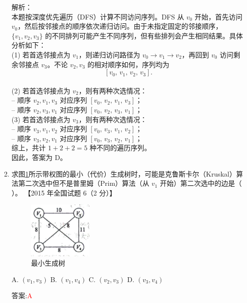 \documentclass[lang=cn,newtx,10pt,scheme=chinese]{../../../elegantbook}
\begin{document}
\begin{enumerate}
    解析：\\
    本题按深度优先遍历（DFS）计算不同访问序列。DFS 从 $v_0$ 开始，首先访问 $v_0$，然后按邻接点的顺序依次递归访问。由于未指定固定的邻接顺序，$\{v_1,v_2,v_3\}$ 的不同排列可能产生不同序列，但有些排列会产生相同结果。具体分析如下：\\
    (1) 若首选邻接点为 $v_1$，则递归访问路径为 $v_0\to v_1\to v_2$，再回到 $v_0$ 访问剩余邻接点 $v_3$。不论 $v_2,v_3$ 的相对顺序如何，序列均为  
    \[
      [v_0,\,v_1,\,v_2,\,v_3].
    \]\\
    (2) 若首选邻接点为 $v_2$，则有两种次选情况：\\
    – 顺序 $v_2,v_1,v_3$ 对应序列 $[v_0,\,v_2,\,v_1,\,v_3]$；\\
    – 顺序 $v_2,v_3,v_1$ 对应序列 $[v_0,\,v_2,\,v_3,\,v_1]$；\\
    (3) 若首选邻接点为 $v_3$，则有两种次选情况：\\
    – 顺序 $v_3,v_1,v_2$ 对应序列 $[v_0,\,v_3,\,v_1,\,v_2]$；\\
    – 顺序 $v_3,v_2,v_1$ 对应序列 $[v_0,\,v_3,\,v_2,\,v_1]$；\\
    综上，共计 $1 + 2 + 2 = 5$ 种不同的遍历序列。\\
    因此，答案为 D。 
    
        \item 求图\ref{fig:7-21}所示带权图的最小（代价）生成树时，可能是克鲁斯卡尔（Kruskal）算法第二次选中但不是普里姆（Prim）算法（从 $v_1$ 开始）第二次选中的边是（ ）。  
        【2015 年全国试题 6（2 分）】  

        \begin{figure}[h!]
            \centering
            \includegraphics[width=0.3\textwidth]{../../figure/exercisePicPDF/chapter7/7-21.pdf}
            \caption{最小生成树}
            \label{fig:7-21}
        \end{figure}

        A. $(v_1, v_3)$ \quad B. $(v_1, v_4)$ \quad C. $(v_2, v_3)$ \quad D. $(v_3, v_4)$  
    
        答案:\textcolor{red}{A}


\end{enumerate}
\end{document}
